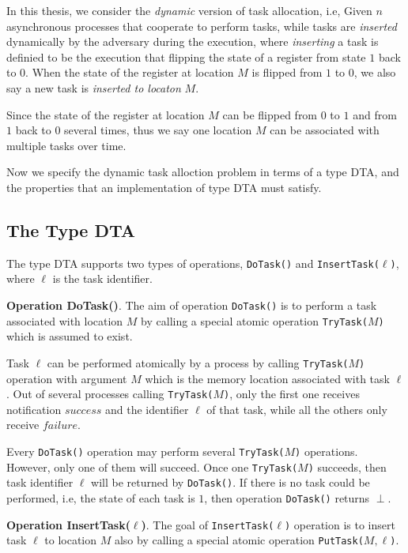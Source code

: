 In this thesis, we consider the \emph{dynamic} version of task allocation, i.e, Given $n$
asynchronous processes that cooperate to perform tasks, while tasks are \emph{inserted}
dynamically by the adversary during the execution, where \emph{inserting} a task is definied to be
the execution that flipping the state of a register from state $1$ back to $0$.
When the state of the register at location $M$
is flipped from $1$ to $0$, we also say a new task is \emph{inserted to locaton} $M$.

Since the state of the register at location $M$ can be flipped from $0$ to $1$ and from $1$ back to $0$
several times, thus we say one location $M$ can be associated with multiple tasks over time.

Now we specify the dynamic task alloction problem in terms of a type DTA, and the properties
that an implementation of type DTA must satisfy.

\subsection{The Type DTA}

The type DTA supports two types of operations, \texttt{DoTask()} and
\texttt{InsertTask(}$\ell$\texttt{)}, where $\ell$ is the task identifier.


\textbf{Operation DoTask()}.
The aim of operation \texttt{DoTask()} is to perform a task associated with location $M$ by calling
a special atomic operation \texttt{TryTask(}$M$\texttt{)} which is assumed to exist.

Task $\ell$ can be performed atomically by a process by calling \texttt{TryTask(}$M$\texttt{)} operation
with argument $M$ which is the memory location associated with task $\ell$. Out of several processes
calling \texttt{TryTask(}$M$\texttt{)}, only the first one receives notification $success$ and the identifier $\ell$ of
that task, while all the others only receive $failure$.

Every \texttt{DoTask()} operation may perform several \texttt{TryTask(}$M$\texttt{)}
operations. However, only one of them will succeed. Once one \texttt{TryTask(}$M$\texttt{)} succeeds, then
task identifier $\ell$ will be returned by \texttt{DoTask()}.
If there is no task could be performed, i.e, the state of each task is $1$,
then operation \texttt{DoTask()} returns $\perp$.


\textbf{Operation InsertTask($\ell$)}.
The goal of \texttt{InsertTask(}$\ell$\texttt{)} operation is to insert task $\ell$ to location $M$
also by calling a special atomic operation \texttt{PutTask(}$M,\ell$\texttt{)}.

